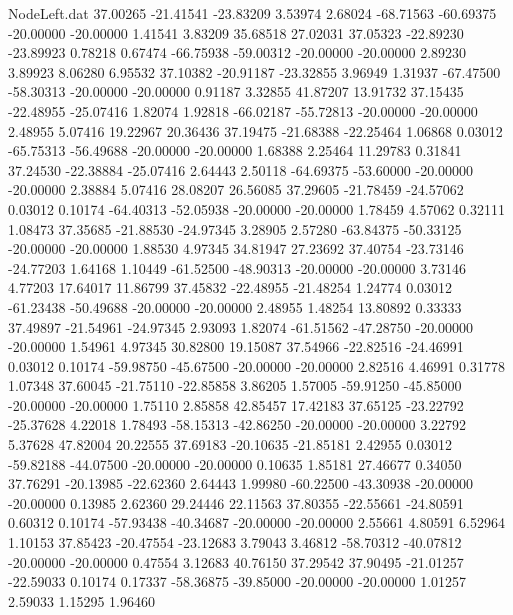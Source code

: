 \begin{filecontents}{NodeLeft.dat}
  37.00265  -21.41541  -23.83209     3.53974    2.68024  -68.71563  -60.69375  -20.00000  -20.00000    1.41541    3.83209   35.68518   27.02031
  37.05323  -22.89230  -23.89923     0.78218    0.67474  -66.75938  -59.00312  -20.00000  -20.00000    2.89230    3.89923    8.06280    6.95532
  37.10382  -20.91187  -23.32855     3.96949    1.31937  -67.47500  -58.30313  -20.00000  -20.00000    0.91187    3.32855   41.87207   13.91732
  37.15435  -22.48955  -25.07416     1.82074    1.92818  -66.02187  -55.72813  -20.00000  -20.00000    2.48955    5.07416   19.22967   20.36436
  37.19475  -21.68388  -22.25464     1.06868    0.03012  -65.75313  -56.49688  -20.00000  -20.00000    1.68388    2.25464   11.29783    0.31841
  37.24530  -22.38884  -25.07416     2.64443    2.50118  -64.69375  -53.60000  -20.00000  -20.00000    2.38884    5.07416   28.08207   26.56085
  37.29605  -21.78459  -24.57062     0.03012    0.10174  -64.40313  -52.05938  -20.00000  -20.00000    1.78459    4.57062    0.32111    1.08473
  37.35685  -21.88530  -24.97345     3.28905    2.57280  -63.84375  -50.33125  -20.00000  -20.00000    1.88530    4.97345   34.81947   27.23692
  37.40754  -23.73146  -24.77203     1.64168    1.10449  -61.52500  -48.90313  -20.00000  -20.00000    3.73146    4.77203   17.64017   11.86799
  37.45832  -22.48955  -21.48254     1.24774    0.03012  -61.23438  -50.49688  -20.00000  -20.00000    2.48955    1.48254   13.80892    0.33333
  37.49897  -21.54961  -24.97345     2.93093    1.82074  -61.51562  -47.28750  -20.00000  -20.00000    1.54961    4.97345   30.82800   19.15087
  37.54966  -22.82516  -24.46991     0.03012    0.10174  -59.98750  -45.67500  -20.00000  -20.00000    2.82516    4.46991    0.31778    1.07348
  37.60045  -21.75110  -22.85858     3.86205    1.57005  -59.91250  -45.85000  -20.00000  -20.00000    1.75110    2.85858   42.85457   17.42183
  37.65125  -23.22792  -25.37628     4.22018    1.78493  -58.15313  -42.86250  -20.00000  -20.00000    3.22792    5.37628   47.82004   20.22555
  37.69183  -20.10635  -21.85181     2.42955    0.03012  -59.82188  -44.07500  -20.00000  -20.00000    0.10635    1.85181   27.46677    0.34050
  37.76291  -20.13985  -22.62360     2.64443    1.99980  -60.22500  -43.30938  -20.00000  -20.00000    0.13985    2.62360   29.24446   22.11563
  37.80355  -22.55661  -24.80591     0.60312    0.10174  -57.93438  -40.34687  -20.00000  -20.00000    2.55661    4.80591    6.52964    1.10153
  37.85423  -20.47554  -23.12683     3.79043    3.46812  -58.70312  -40.07812  -20.00000  -20.00000    0.47554    3.12683   40.76150   37.29542
  37.90495  -21.01257  -22.59033     0.10174    0.17337  -58.36875  -39.85000  -20.00000  -20.00000    1.01257    2.59033    1.15295    1.96460

\end{filecontents}
